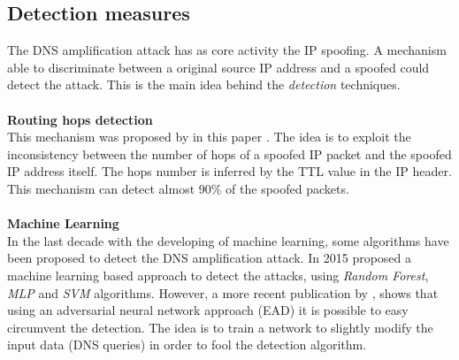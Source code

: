 \subsection{Detection measures}
The DNS amplification attack has as core activity the IP spoofing. A mechanism able to discriminate between a original source IP address
and a spoofed could detect the attack. This is the main idea behind the \textit{detection} techniques.\\
\\
\textbf{Routing hops detection}\\
This mechanism was proposed by \citeauthor{hopcount} in this paper \cite{hopcount}. The idea is to exploit the inconsistency between the
number of hops of a spoofed IP packet and the spoofed IP address itself. The hops number is inferred by the TTL value in the IP header.
This mechanism can detect almost 90\% of the spoofed packets.\\
\\
\textbf{Machine Learning}\\
In the last decade with the developing of machine learning, some algorithms have been proposed to detect the DNS amplification attack.
In 2015 \citeauthor{machinelearning} \cite{machinelearning} proposed a machine learning based approach to detect the attacks, using 
\textit{Random Forest}, \textit{MLP} and \textit{SVM} algorithms. However, a more recent publication \cite{createDNS} by 
\citeauthor{createDNS}, shows that using an adversarial neural network approach (EAD) it is possible to easy circumvent the detection. 
The idea is to train a network to slightly modify the input data (DNS queries) in order to fool the detection algorithm.

